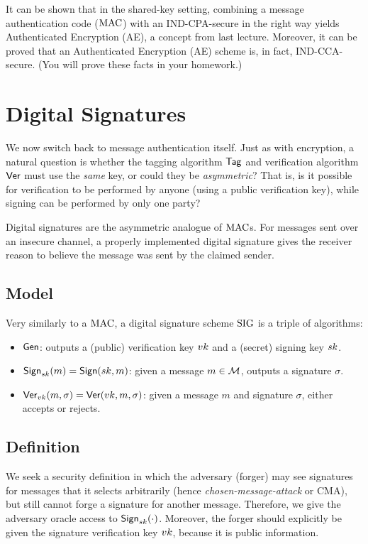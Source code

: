 \documentclass[11pt]{article}
\begin{document}
It can be shown that in the shared-key setting, combining a message
authentication code ($\text{MAC}$) with an IND-CPA-secure in the right way
yields Authenticated Encryption (AE), a concept from last lecture.
Moreover, it can be proved that an Authenticated Encryption (AE)
scheme is, in fact, IND-CCA-secure.  (You will prove these facts in
your homework.)

\section{Digital Signatures}
\label{sec:digital-signatures}

We now switch back to message authentication itself.  Just as with
encryption, a natural question is whether the tagging algorithm
$\mathsf{Tag}$ and verification algorithm $\mathsf{Ver}$ must use the
\emph{same} key, or could they be \emph{asymmetric}?  That is, is it
possible for verification to be performed by anyone (using a public
verification key), while signing can be performed by only one party?

Digital signatures are the asymmetric analogue of $\text{MAC}$s. For
messages sent over an insecure channel, a properly implemented digital
signature gives the receiver reason to believe the message was sent by
the claimed sender.

\subsection{Model}
\label{sec:model}

Very similarly to a $\text{MAC}$, a digital signature scheme $\text{SIG}$ is a
triple of algorithms:

\begin{itemize}
\item $\mathsf{Gen}$: outputs a (public) verification key $vk$ and a
  (secret) signing key $sk$.
\item $\mathsf{Sign}_{sk}(m) = \mathsf{Sign}(sk,m)$: given a message $m \in
  \mathcal{M}$, outputs a signature $\sigma$.
\item $\mathsf{Ver}_{vk}(m,\sigma) = \mathsf{Ver}(vk,m,\sigma)$: given a
  message $m$ and signature $\sigma$, either accepts or rejects.
\end{itemize}

\subsection{Definition}
\label{sec:uf-cma-definition}

We seek a security definition in which the adversary (forger) may see
signatures for messages that it selects arbitrarily (hence
\textit{chosen-message-attack} or CMA), but still cannot forge a
signature for another message.  Therefore, we give the adversary
oracle access to $\mathsf{Sign}_{sk}(\cdot)$.  Moreover, the forger should
explicitly be given the signature verification key $vk$, because it
is public information.
\end{document}
